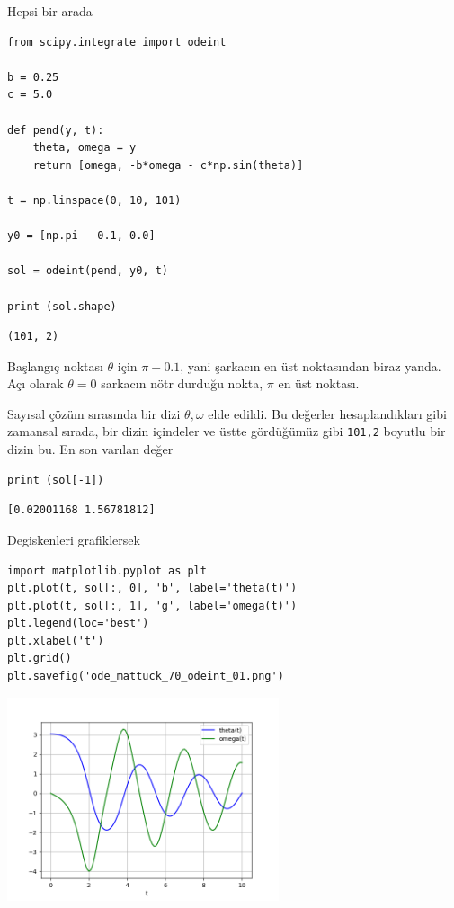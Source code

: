 \documentclass[12pt,fleqn]{article}\usepackage{../../common}
\begin{document}
Hepsi bir arada

\begin{verbatim}
from scipy.integrate import odeint

b = 0.25
c = 5.0

def pend(y, t):
    theta, omega = y
    return [omega, -b*omega - c*np.sin(theta)]

t = np.linspace(0, 10, 101)

y0 = [np.pi - 0.1, 0.0]

sol = odeint(pend, y0, t)

print (sol.shape)
\end{verbatim}

\begin{verbatim}
(101, 2)
\end{verbatim}

Başlangıç noktası $\theta$ için $\pi - 0.1$, yani şarkacın en üst
noktasından biraz yanda. Açı olarak $\theta=0$ sarkacın nötr durduğu nokta,
$\pi$ en üst noktası.

Sayısal çözüm sırasında bir dizi $\theta,\omega$ elde edildi. Bu değerler
hesaplandıkları gibi zamansal sırada, bir dizin içindeler ve üstte
gördüğümüz gibi \verb!101,2! boyutlu bir dizin bu. En son varılan değer

\begin{verbatim}
print (sol[-1])
\end{verbatim}

\begin{verbatim}
[0.02001168 1.56781812]
\end{verbatim}

Degiskenleri grafiklersek

\begin{verbatim}
import matplotlib.pyplot as plt
plt.plot(t, sol[:, 0], 'b', label='theta(t)')
plt.plot(t, sol[:, 1], 'g', label='omega(t)')
plt.legend(loc='best')
plt.xlabel('t')
plt.grid()
plt.savefig('ode_mattuck_70_odeint_01.png')
\end{verbatim}

\includegraphics[height=6cm]{ode_mattuck_70_odeint_01.png}
\end{document}
